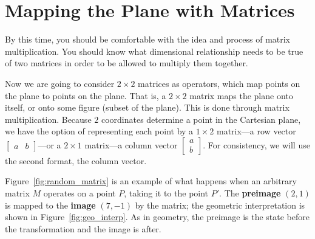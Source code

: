 \documentclass[../gatm.tex]{subfiles}
\begin{document}
\section{Mapping the Plane with Matrices}

By this time, you should be comfortable with the idea and process of matrix multiplication. You should know what dimensional relationship needs to be true of two matrices in order to be allowed to multiply them together.

Now we are going to consider $2\times 2$ matrices as operators, which map points on the plane to points on the plane. That is, a $2\times 2$ matrix maps the plane onto itself, or onto some figure (subset of the plane). This is done through matrix multiplication. Because $2$ coordinates determine a point in the Cartesian plane, we have the option of representing each point by a $1\times 2$ matrix---a row vector $\left[\begin{array}{cc}a & b \end{array}\right]$---or a $2\times 1$ matrix---a column vector $\left[\begin{smallmatrix}a \\ b \end{smallmatrix}\right]$. For consistency, we will use the second format, the column vector.

Figure~\ref{fig:random_matrix} is an example of what happens when an arbitrary matrix $M$ operates on a point $P$, taking it to the point $P'$. The \textbf{preimage} $(2,1)$ is mapped to the \textbf{image} $(7, -1)$ by the matrix; the geometric interpretation is shown in Figure~\ref{fig:geo_interp}. As in geometry, the preimage is the state before the transformation and the image is after.
\end{document}
